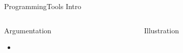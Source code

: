 %
\begin{Frame}{ProgrammingTools Intro}
  \begin{columns}[t]
    \begin{column}{5cm} %
      \begin{block}{Argumentation}
        \begin{itemize}
        \item 
        \end{itemize}
      \end{block} 
    \end{column}
    
    \begin{column}{5cm} %
      \begin{block}{Illustration}
      \end{block}   
    \end{column}
  \end{columns}  
\end{Frame}


